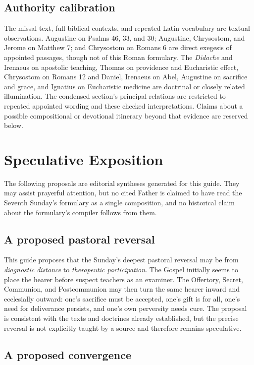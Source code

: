 \begin{deepstudy}
\sectionguard
\subsection*{Authority calibration}

The missal text, full biblical contexts, and repeated Latin vocabulary are textual observations. Augustine on Psalms 46, 33, and 30; Augustine, Chrysostom, and Jerome on Matthew 7; and Chrysostom on Romans 6 are direct exegesis of appointed passages, though not of this Roman formulary. The \emph{Didache} and Irenaeus on apostolic teaching, Thomas on providence and Eucharistic effect, Chrysostom on Romans 12 and Daniel, Irenaeus on Abel, Augustine on sacrifice and grace, and Ignatius on Eucharistic medicine are doctrinal or closely related illumination. The condensed section's principal relations are restricted to repeated appointed wording and these checked interpretations. Claims about a possible compositional or devotional itinerary beyond that evidence are reserved below.

\section*{Speculative Exposition}

The following proposals are editorial syntheses generated for this guide. They may assist prayerful attention, but no cited Father is claimed to have read the Seventh Sunday's formulary as a single composition, and no historical claim about the formulary's compiler follows from them.

\subsection*{A proposed pastoral reversal}

This guide proposes that the Sunday's deepest pastoral reversal may be from \emph{diagnostic distance} to \emph{therapeutic participation}. The Gospel initially seems to place the hearer before suspect teachers as an examiner. The Offertory, Secret, Communion, and Postcommunion may then turn the same hearer inward and ecclesially outward: one's sacrifice must be accepted, one's gift is for all, one's need for deliverance persists, and one's own perversity needs cure. The proposal is consistent with the texts and doctrines already established, but the precise reversal is not explicitly taught by a source and therefore remains speculative.

\subsection*{A proposed convergence}


\end{deepstudy}
